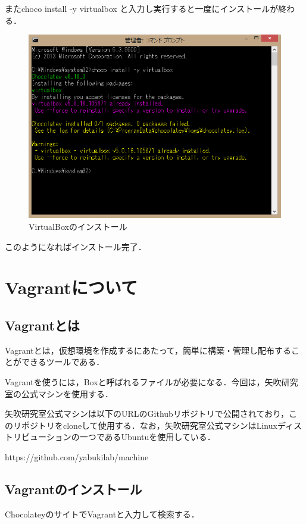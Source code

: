 またchoco install -y virtualbox と入力し実行すると一度にインストールが終わる．
\begin{figure}[h]
\centering
\includegraphics[width=12cm]{virtualboxinstall2.PNG}
\caption{VirtualBoxのインストール}\label{サンプル図}
\end{figure}

このようになればインストール完了．
\newpage


\section{Vagrantについて}
\subsection{Vagrantとは}
Vagrantとは，仮想環境を作成するにあたって，簡単に構築・管理し配布することができるツールである．

Vagrantを使うには，Boxと呼ばれるファイルが必要になる．今回は，矢吹研究室の公式マシンを使用する．

矢吹研究室公式マシンは以下のURLのGithubリポジトリで公開されており，このリポジトリをcloneして使用する．なお，矢吹研究室公式マシンはLinuxディストリビューションの一つであるUbuntuを使用している．

https://github.com/yabukilab/machine


\newpage


\subsection{Vagrantのインストール}
ChocolateyのサイトでVagrantと入力して検索する．

